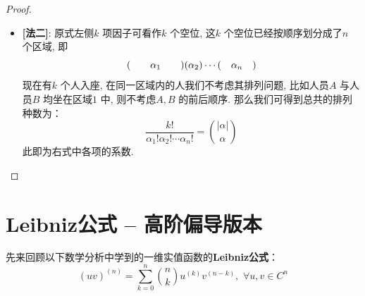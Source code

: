 \begin{thm}
\begin{proof}
\begin{itemize}
				\newpage
				
				\item \textbf{[法二]}: 原式左侧$k$ 项因子可看作$k$ 个空位, 这$k$ 个空位已经按顺序划分成了$n$ 个区域, 即
				\[ ( \hspace*{2em} \alpha_1 \hspace*{2em}) (\alpha_2) \cdots ( \hspace*{1em} \alpha_n \hspace*{1em} ) \]
				现在有$k$ 个人入座, 在同一区域内的人我们不考虑其排列问题, 比如人员$A$ 与人员$B$ 均坐在区域$1$ 中, 则不考虑$A , B$ 的前后顺序. 那么我们可得到总共的排列种数为：
				\[ \dfrac{k !}{\alpha_1 ! \alpha_2 ! \cdots \alpha_n !} = {\left| \alpha \right| \choose \alpha} \]
				此即为右式中各项的系数.
			\end{itemize}
		\end{proof}
	\end{thm}

\newpage

\section{Leibniz公式 -- 高阶偏导版本}
	先来回顾以下数学分析中学到的一维实值函数的\textbf{Leibniz公式}：
	\[ (uv)^{(n)} = \sum_{k = 0}^{n} {n \choose k} u^{(k)} v^{(n - k)} , \,\, \forall u , v \in C^n \]
	
	\vspace{6em}
	
